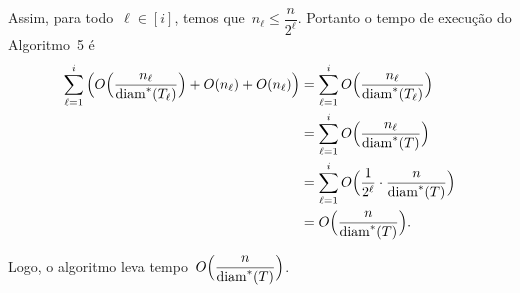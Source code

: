 		Assim, para todo~${\ell\in[i]}$, temos que~$n_\ell \le\dfrac{n} {2^{\ell}}$.
		Portanto o tempo de execução do Algoritmo~5 é
		\begin{align}
			\displaystyle\sum_{\ell=1}^{i} \Big(O\Big(\dfrac{n_\ell}{\mathrm{diam}^*(T_\ell)}\Big)
			+ O(n_\ell) + O(n_\ell)\Big)
			&= \displaystyle\sum_{\ell=1}^{i} O\Big(\dfrac{n_\ell}{\mathrm{diam}^*(T_\ell)}\Big) \nonumber\\
			&= \displaystyle\sum_{\ell=1}^{i} O\Big(\dfrac{n_\ell}{\mathrm{diam}^*(T)}\Big) \nonumber\\
			&= \displaystyle\sum_{\ell=1}^{i} O\Big(\dfrac{1}{2^{\ell}}
			\cdot\dfrac{n}{\mathrm{diam}^*(T)}\Big) \nonumber\\
			&= O\Big(\dfrac{n}{\mathrm{diam}^*(T)}\Big). \nonumber
		\end{align}

		Logo, o algoritmo leva tempo~$O\Big(\dfrac{n}{\mathrm{diam}^*(T)}\Big)$.

		\bigskip
		\bigskip
		\bigskip
